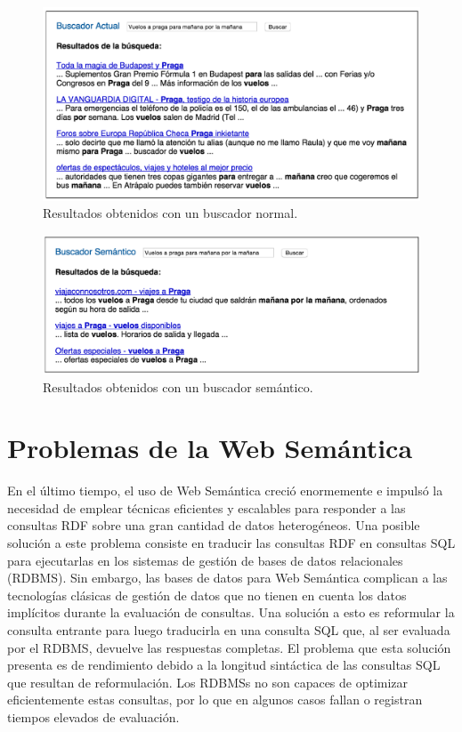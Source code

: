 \documentclass[10pt,a4paper]{article}
\begin{document}
\begin{figure}[H] %
\begin{center}
\includegraphics[width=400pt]{imgs/resultadoNormal}
\caption{Resultados obtenidos con un buscador normal.}
\end{center}
\end{figure}
\begin{figure}[H] %
\begin{center}
\includegraphics[width=400pt]{imgs/resultadoSemantico}
\caption{Resultados obtenidos con un buscador semántico.}
\end{center}
\end{figure}
\newpage
\section{Problemas de la Web Semántica}
En el último tiempo, el uso de Web Semántica creció enormemente e impulsó la necesidad de emplear técnicas eficientes y escalables para responder a las consultas RDF sobre una gran cantidad de datos heterogéneos. Una posible solución a este problema consiste en traducir las consultas RDF en consultas SQL para ejecutarlas en los sistemas de gestión de bases de datos relacionales (RDBMS). Sin embargo, las bases de datos para Web Semántica complican a las tecnologías clásicas de gestión de datos que no tienen en cuenta los datos implícitos durante la evaluación de consultas. Una solución a esto es reformular la consulta entrante para luego traducirla en una consulta SQL que, al ser evaluada por el RDBMS, devuelve las respuestas completas. El problema que esta solución presenta es de rendimiento debido a la longitud sintáctica de las consultas SQL que resultan de reformulación. Los RDBMSs no son capaces de optimizar eficientemente estas consultas, por lo que en algunos casos fallan o registran tiempos elevados de evaluación.
\end{document}
